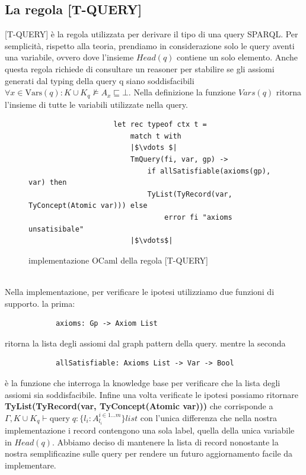             \subsection{La regola [T-QUERY]}
            [T-QUERY] è la regola utilizzata per derivare il tipo di una query SPARQL. Per semplicità, rispetto alla teoria, prendiamo in considerazione solo le query
            aventi una variabile, ovvero dove l'insieme $Head(q)$ contiene un solo elemento. Anche questa regola richiede di consultare un reasoner per stabilire se
            gli assiomi generati dal typing della query q siano soddisfacibili $\forall x \in \textrm{Vars}(q) : K \cup K_q \nvDash A_x \sqsubseteq \bot$.
            Nella definizione la funzione $Vars(q)$ ritorna l'insieme di tutte le variabili utilizzate nella query.
            \begin{figure}[h]
                \begin{verbatim}
                    let rec typeof ctx t =
                        match t with
                        |$\vdots $|
                        TmQuery(fi, var, gp) ->
                            if allSatisfiable(axioms(gp), var) then
                            TyList(TyRecord(var, TyConcept(Atomic var))) else
                                error fi "axioms unsatisibale"
                        |$\vdots$|
                \end{verbatim}
            \caption{implementazione OCaml della regola [T-QUERY]}
            \end{figure}
            \\Nella implementazione, per verificare le ipotesi utilizziamo due funzioni di supporto. la prima:
            \begin{verbatim}
            axioms: Gp -> Axiom List
            \end{verbatim}
            ritorna la lista degli assiomi dal graph pattern della query. mentre la seconda
            \begin{verbatim}
            allSatisfiable: Axioms List -> Var -> Bool
            \end{verbatim}
            è la funzione che interroga la knowledge base per verificare che la lista degli assiomi sia soddisfacibile. Infine una volta verificate le ipotesi possiamo
            ritornare
            \\\textbf{TyList(TyRecord(var, TyConcept(Atomic \; var)))} che corrisponde a $\Gamma,K \cup K_q \vdash \textrm{query} \; q : \{l_i : A_{l_i}^{i \in 1...m}\} list$
            con l'unica differenza che nella nostra implementazione i record contengono una sola label, quella della unica variabile in $Head(q)$. Abbiamo deciso di
            mantenere la lista di record nonostante la nostra semplificazine sulle query per rendere un futuro aggiornamento facile da implementare.
